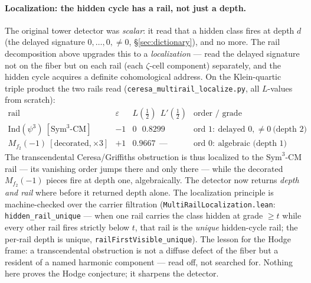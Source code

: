 \documentclass[11pt]{article}
\theoremstyle{definition}
\theoremstyle{remark}
\begin{document}
\paragraph{Localization: the hidden cycle has a rail, not just a depth.} The
original tower detector was \emph{scalar}: it read that a hidden class fires at
depth $d$ (the delayed signature $0,\dots,0,\neq0$,
\S\ref{sec:dictionary}), and no more. The rail decomposition above upgrades this
to a \emph{localization} --- read the delayed signature not on the fiber but on
each rail (each $\zeta$-cell component) separately, and the hidden cycle acquires
a definite cohomological address. On the Klein-quartic triple product the two
rails read (\texttt{ceresa\_multirail\_localize.py}, all $L$-values from scratch):
\[
  \begin{array}{lccl}
  \text{rail} & \varepsilon & L(\tfrac12)\ \ L'(\tfrac12) & \text{order / grade}\\[2pt]
  \mathrm{Ind}(\psi^3)\ [\text{Sym}^3\text{-CM}] & -1 & 0\ \ \ 0.8299 & \text{ord }1:\ \text{delayed }0,\neq0\ \text{(depth 2)}\\
  M_{f_2}(-1)\ [\text{decorated},\times3] & +1 & 0.9667\ \ \text{---} & \text{ord }0:\ \text{algebraic (depth 1)}
  \end{array}
\]
The transcendental Ceresa/Griffiths obstruction is thus localized to the
$\mathrm{Sym}^3$-CM rail --- its vanishing order jumps there and only there ---
while the decorated $M_{f_2}(-1)$ pieces fire at depth one, algebraically. The
detector now returns \emph{depth and rail} where before it returned depth alone.
The localization principle is machine-checked over the carrier filtration
(\texttt{MultiRailLocalization.lean}: \texttt{hidden\_rail\_unique} --- when one
rail carries the class hidden at grade $\ge t$ while every other rail fires
strictly below $t$, that rail is the \emph{unique} hidden-cycle rail; the
per-rail depth is unique, \texttt{railFirstVisible\_unique}). The lesson for the
Hodge frame: a transcendental obstruction is not a diffuse defect of the fiber
but a resident of a named harmonic component --- read off, not searched for.
Nothing here proves the Hodge conjecture; it sharpens the detector.
\end{document}
